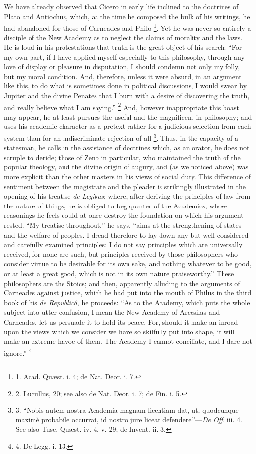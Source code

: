 We have already observed
that Cicero in early life inclined to the doctrines of Plato and
Antiochus, which, at the time he composed the bulk of his writings, he
had abandoned for those of Carneades and Philo \footnote{1. Acad. Quæst. i. 4; de Nat.
Deor. i. 7.}. Yet he was
never so entirely a disciple of the New Academy as to neglect
the claims of morality and the laws. He is loud in his protestations
that truth is the great object of his search: ``For my own part, if I
have applied myself especially to this philosophy, through any love of
display or pleasure in disputation, I should condemn not only my
folly, but my moral condition. And, therefore, unless it were absurd,
in an argument like this, to do what is sometimes done in political
discussions, I would swear by Jupiter and the divine Penates that I
burn with a desire of discovering the truth, and really believe what I
am saying.'' \footnote{2. Lucullus, 20; see also de
Nat. Deor. i. 7; de Fin. i. 5.} And, however inappropriate this boast may
appear, he at least pursues the useful and the magnificent in
philosophy; and uses his academic character as a pretext rather for a
judicious selection from each system than for an indiscriminate
rejection of all \footnote{3.
``Nobis autem nostra Academia magnam licentiam dat, ut, quodcunque
maximè probabile occurrat, id nostro jure liceat defendere.''—\emph{De Off}. iii. 4.
See also Tusc. Quæst. iv. 4, v. 29; de Invent. ii. 3.}. Thus, in the capacity of a statesman, he
calls in the assistance of doctrines which, as an orator, he does not
scruple to deride; those of Zeno in particular, who maintained the
truth of the popular theology, and the divine origin of augury, and
(as we noticed above) was more explicit than the other masters in his
views of social duty. This difference of sentiment between the
magistrate and the pleader is strikingly illustrated in the opening of
his treatise \emph{de Legibus}; where, after deriving the principles
of law from the nature of things, he is obliged to beg quarter of the
Academics, whose reasonings he feels could at once destroy the
foundation on which his argument rested. ``My treatise throughout,''
he says, ``aims at the strengthening of states and the welfare of
peoples. I dread therefore to lay down any but well considered and
carefully examined principles; I do not say principles which are
universally received, for none are such, but principles received by
those philosophers who consider virtue to be desirable for its own
sake, and nothing whatever to be good, or at least a great good, which
is not in its own nature praiseworthy.'' These philosophers are the
Stoics; and then, apparently alluding to the arguments of Carneades
against justice, which he had put into the mouth of Philus in the
third book of his \emph{de Republicâ}, he proceeds: ``As to the
Academy, which puts the whole subject into utter confusion, I mean the
New Academy of Arcesilas and Carneades, let us persuade it to hold its
peace. For, should it make an inroad upon the views which we consider
we have so skilfully put into shape, it will make an extreme havoc of
them. The Academy I cannot conciliate, and I dare not ignore.'' \footnote{4. De Legg.
i. 13.}

